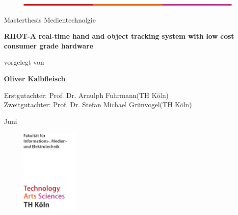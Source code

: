 \begin{titlepage}

\begin{center}
\begin{figure}[!ht]
	\centering
		\includegraphics[width=\textwidth]{images/th_color_bar.png}
\end{figure}
\end{center}
\begin{flushleft}
\begin{Large}
Masterthesis Medientechnolgie\\
\end{Large}
\vspace{0.5cm}
\begin{LARGE}
\textbf{RHOT-A real-time hand and object tracking system with low cost consumer grade hardware}
\end{LARGE}
\end{flushleft}
\vspace{1.0cm}
\begin{flushleft}
\begin{Large}
vorgelegt von\\ 
\vspace{0.3cm}
\begin{LARGE}
\textbf{Oliver Kalbfleisch} \\
\end{LARGE}
\end{Large}
\end{flushleft}
\vspace{2.0cm}
\begin{flushleft}
\begin{Large}
Erstgutachter: Prof. Dr. Arnulph Fuhrmann(TH Köln) \\[1.0em]
Zweitgutachter: Prof. Dr. Stefan Michael Grünvogel(TH Köln)
\end{Large}
\end{flushleft}
\vspace{1.5cm}
\begin{flushleft}
\begin{large}
Juni \the\year
\end{large}
\end{flushleft}
\begin{figure}[!ht]
\begin{flushright}
\includegraphics[width=0.25\textwidth]{images/TH_bottom_logo.png}

\end{flushright}
\end{figure}
\end{titlepage}
